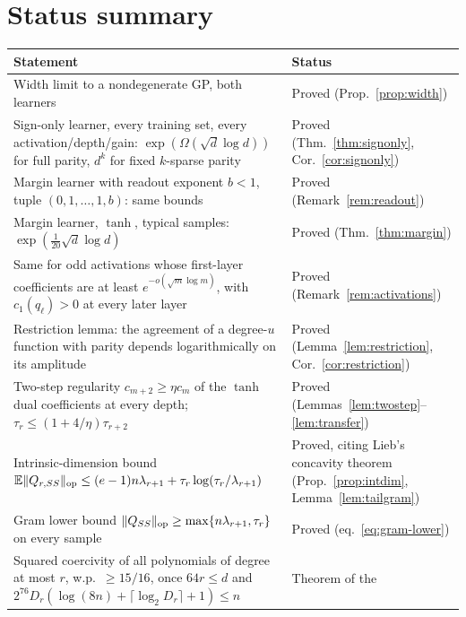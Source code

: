\documentclass[11pt]{article}
\theoremstyle{definition}\newtheorem{assumption}[theorem]{Assumption}
\theoremstyle{remark}\newtheorem{remark}[theorem]{Remark}
\newcommand{\E}{\mathbb E}
\begin{document}


\section{Status summary}
\begin{longtable}{@{}>{\raggedright\arraybackslash}p{}
 >{\raggedright\arraybackslash}p{}@{}}
\toprule
Statement & Status\\
\midrule
\endhead
\bottomrule
\endfoot
Width limit to a nondegenerate GP, both learners & Proved (Prop.~\ref{prop:width})\\\addlinespace[3pt]
Sign-only learner, every training set, every activation/depth/gain:
$\exp(\Omega(\sqrt d\log d))$ for full parity, $d^k$ for fixed $k$-sparse
parity & Proved (Thm.~\ref{thm:signonly}, Cor.~\ref{cor:signonly})\\\addlinespace[3pt]
Margin learner with readout exponent $b<1$, tuple $(0,1,\ldots,1,b)$: same
bounds & Proved (Remark~\ref{rem:readout})\\\addlinespace[3pt]
Margin learner, $\tanh$, typical samples: $\exp(\frac1{20}\sqrt d\log d)$
& Proved (Thm.~\ref{thm:margin})\\\addlinespace[3pt]
Same for odd activations whose first-layer coefficients are at least
$e^{-o(\sqrt m\log m)}$, with $c_1(q_\ell)>0$ at every later layer
& Proved (Remark~\ref{rem:activations})\\\addlinespace[3pt]
Restriction lemma: the agreement of a degree-$u$ function with parity
depends logarithmically on its amplitude & Proved
(Lemma~\ref{lem:restriction}, Cor.~\ref{cor:restriction})\\\addlinespace[3pt]
Two-step regularity $c_{m+2}\ge\eta c_m$ of the $\tanh$ dual coefficients
at every depth; $\tau_r\le(1+4/\eta)\tau_{r+2}$ & Proved
(Lemmas~\ref{lem:twostep}--\ref{lem:transfer})\\\addlinespace[3pt]
Intrinsic-dimension bound
$\E\|Q_{r,SS}\|_{\rm op}\le(e-1)n\lambda_{r+1}+\tau_r\log(\tau_r/\lambda_{r+1})$
& Proved, citing Lieb's concavity theorem (Prop.~\ref{prop:intdim},
Lemma~\ref{lem:tailgram})\\\addlinespace[3pt]
Gram lower bound $\|Q_{SS}\|_{\rm op}\ge\max\{n\lambda_{r+1},\tau_r\}$ on
every sample & Proved (eq.~\eqref{eq:gram-lower})\\\addlinespace[3pt]
Squared coercivity of all polynomials of degree at most $r$, w.p.\
$\ge15/16$, once $64r\le d$ and
$2^{76}D_r(\log(8n)+\lceil\log_2D_r\rceil+1)\le n$ & Theorem of the

\end{longtable}
\end{document}
